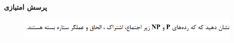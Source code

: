 \textbf{پرسش امتیازی}

\begin{figure}[H]
    \centering
    \includegraphics[scale=0.87]{questions/6.png}
\end{figure}
